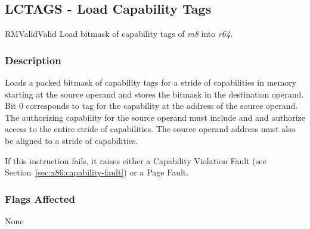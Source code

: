 \clearpage
{}
{}
\subsection*{LCTAGS - Load Capability Tags}

\begin{x86opcodetable}
  {RM}{Valid}{Valid}
  {Load bitmask of capability tags of \emph{m8} into \emph{r64}.}
\end{x86opcodetable}

\begin{x86opentable}
\end{x86opentable}

\subsubsection*{Description}

Loads a packed bitmask of capability tags for a stride of capabilities
in memory starting at the source operand and stores the bitmask in the
destination operand.  Bit 0 corresponds to tag for the capability at
the address of the source operand.  The authorizing capability for the
source operand must include \cappermL{} and \cappermLC{} and authorize
access to the entire stride of capabilities.  The source operand
address must also be aligned to a stride of capabilities.

If this instruction fails, it raises either a Capability Violation
Fault (see Section~\ref{sec:x86:capability-fault}) or a Page Fault.

\subsubsection*{Flags Affected}

None
